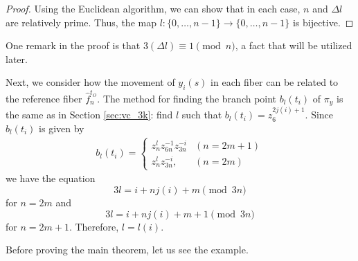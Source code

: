 \documentclass[10pt,a4paper,reqno]{amsart}
\theoremstyle{definition}
\numberwithin{equation}{section}
\numberwithin{figure}{section}
\newcommand{\arrowr}{\rightarrow}
\begin{document}
\begin{proof}
Using the Euclidean algorithm, we can show that in each case, $n$ and $\Delta l$ are relatively prime. 
Thus, the map 
$l: \{0,\dots, n-1\} \arrowr \{0,\dots, n-1\}$ is bijective.
\end{proof}
One remark in the proof is that $3 (\Delta l) \equiv 1 \pmod n$, a fact that will be utilized later.

Next, we consider how the movement of $y_i (s)$ in each fiber can be related to the reference fiber $\hat{f}_n^{t_O}$.
The method for finding the branch point $b_l(t_i)$ of $\pi_y$ is the same as in Section \ref{sec:vc_3k}:
find $l$ such that $b_{l}(t_i)=z_6^{2j(i)+1}$.
Since $b_{l}(t_i)$ is given by
\begin{align*}
b_{l}(t_i)=\begin{cases} z_n^l z_{6n}^{-1}z_{3n}^{-i} & (n=2m+1) \\ z_n^l z_{3n}^{-i}, & (n=2m) \end{cases}
\end{align*}
we have the equation \[3l=i+nj(i)+m \pmod{3n} \] for $n=2m$ and \[3l=i+nj(i)+m+1 \pmod{3n}\] for $n=2m+1$.
Therefore, $l=l(i)$.

Before proving the main theorem, let us see the example.
\end{document}
